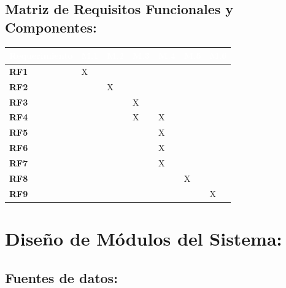 \documentclass[12pt,a4paper]{article}
\begin{document}
                
    \subsection{\textbf{Matriz de Requisitos Funcionales y Componentes:}}
                
                    \begin{table}[H]
                        \centering
                        \begin{tabularx}{\textwidth}{|X|p{1cm}|p{1cm}|p{1cm}|p{1cm}|p{1cm}|p{1cm}|}
                            \hline
                            \rowcolor{black} 
                            \textcolor{white}{Requerimiento} & \textcolor{white}{M.1} & \textcolor{white}{M.2} & \textcolor{white}{M.3} & \textcolor{white}{M.4} & \textcolor{white}{M.5} & \textcolor{white}{M.6}  \\ \hline
                            
                            \textbf{RF1} & X & & & & & \\ \hline
                            \textbf{RF2} & & X & & & & \\ \hline
                            \textbf{RF3} & & & X & & & \\ \hline
                            \textbf{RF4} & & & X & X & &  \\ \hline
                            \textbf{RF5} & & & & X & & \\ \hline
                            \textbf{RF6} & & & & X & & \\ \hline
                            \textbf{RF7} & & & & X &  & \\ \hline
                            \textbf{RF8} & & & &  & X & \\ \hline
                            \textbf{RF9} & & & &  &  & X \\ \hline
                        \end{tabularx}
                    \end{table}
    
    \section{Diseño de Módulos del Sistema:}
    \label{sec:modulos}
    \subsection{Fuentes de datos:}
\end{document}
